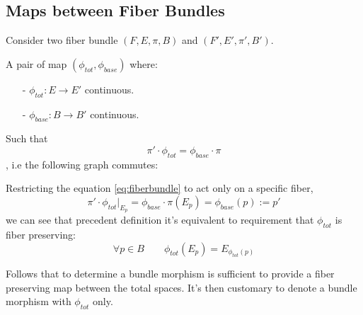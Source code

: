 \documentclass[a4paper,12pt]{scrartcl}    %
\begin{document}
\subsection{Maps between Fiber Bundles}
Consider two fiber bundle $(F,E,\pi,B)$ and $(F',E',\pi',B')$.


\begin{definition}
A pair of map $(\phi_{tot}, \phi_{base})$ where:
\begin{itemize}
\item[-] $\phi_{tot}:E \rightarrow E'$ continuous.
\item[-] $\phi_{base}:B \rightarrow B'$ continuous.
\end{itemize}
Such that 
\begin{equation}\label{eq:fiberbundle}
\pi' \cdot \phi_{tot} = \phi_{base} \cdot \pi
\end{equation}
, i.e the following graph commutes:
\end{definition}

\begin{observation}
Restricting the equation \eqref{eq:fiberbundle} to act only on a specific fiber,
\begin{displaymath}
\pi' \cdot \phi_{tot} \vert_{E_{p}} = \phi_{base} \cdot \pi (E_{p}) = \phi_{base}(p) := p'
\end{displaymath}
we can see that precedent definition it's equivalent to requirement that $\phi_{tot}$ is fiber preserving:
\begin{displaymath}
\forall p \in B \qquad \phi_{tot}(E_{p}) = E_{\phi_{tot}(p)}
\end{displaymath}

Follows that to determine a bundle morphism is sufficient to provide a fiber preserving map between the total spaces. It's then customary to denote a bundle morphism with $\phi_{tot}$ only.
\end{observation}
\end{document}
